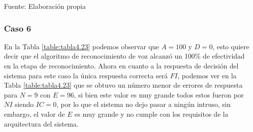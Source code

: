 \begin{center}
\begin{table}[H]
\centering
\caption{\small{Resultados para el caso 5 con U1 dinámico.}}
\label{table:tabla4.22}
\vskip 0.2cm
\begin{center}
\vskip 0.2cm
{\small{Fuente: Elaboración propia}}
\end{center}
\end{table}
\end{center}

\subsubsection{Caso 6}
En la Tabla \ref{table:tabla4.23} podemos observar que $A = 100$ y $D = 0$, esto quiere decir que el algoritmo de reconocimiento de voz alcanzó un 100\% de efectividad en la etapa de reconocimiento.
\vskip 0.5cm
Ahora en cuanto a la respuesta de decisión del sistema para este caso la única respuesta correcta será $FI$, podemos ver en la Tabla \ref{table:tabla4.23} que se obtuvo un número menor de errores de respuesta para $N = 9$ con $E = 96$, si bien este valor es muy grande todos estos fueron por $NI$ siendo $IC = 0$, por lo que el sistema no dejo pasar a ningún intruso, sin embargo, el valor de $E$ es muy grande y no cumple con los requisitos de la arquitectura del sistema.

